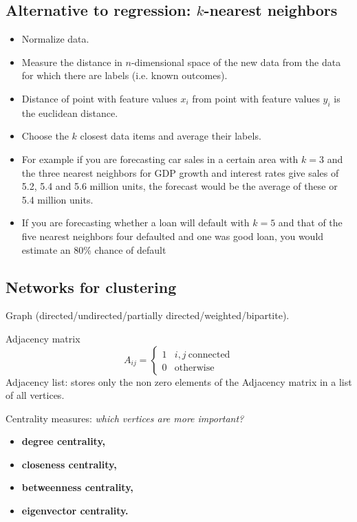 \subsection{Alternative to regression: $k$-nearest neighbors}
\begin{itemize}
    \item Normalize data.
    \item Measure the distance in $n$-dimensional space of the new data from the data for which there are labels (i.e. known outcomes).
    \item Distance of point with feature values $x_{i}$ from point with feature values $y_{i}$ is the euclidean distance.
    \item Choose the $k$ closest data items and average their labels.
    \item For example if you are forecasting car sales in a certain area with $k=3$ and the three nearest neighbors for GDP growth and interest rates give sales of 5.2, 5.4 and 5.6 million units, the forecast would be the average of these or 5.4 million units.
    \item If you are forecasting whether a loan will default with $k=5$ and that of the five nearest neighbors four defaulted and one was good loan, you would estimate an 80\% chance of default
\end{itemize}
\subsection{Networks for clustering}

Graph (directed/undirected/partially directed/weighted/bipartite).

Adjacency matrix
\begin{equation*}
    A_{ij} =
    \begin{cases}
        1 & i,j\ \text{connected} \\
        0 & \text{otherwise}      
    \end{cases}
\end{equation*}
Adjacency list: stores only the non zero elements of the Adjacency matrix in a list of all vertices.

Centrality measures: \textit{which vertices are more important?}
\begin{itemize}
    \item \textbf{degree centrality,}
    \item \textbf{closeness centrality,}
    \item \textbf{betweenness centrality,}
    \item \textbf{eigenvector centrality.}
\end{itemize}

